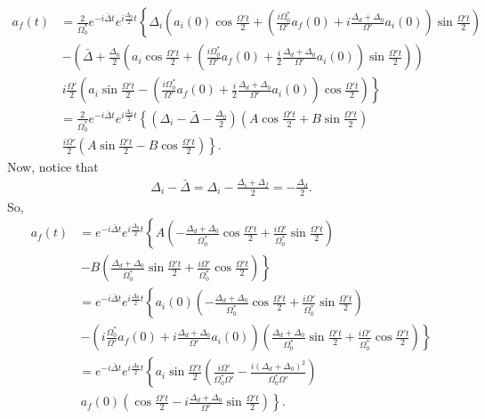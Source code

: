 \documentclass{article}
\begin{document}
\begin{align}
a_f(t) &= \frac{2}{\Omega^*_0}e^{-i\bar{\Delta}t}e^{i\frac{\Delta_0}{2}t}\left\{\Delta_i\left( a_i(0)\cos\frac{\Omega't}{2} + \left(\frac{i\Omega^*_0}{\Omega'}a_f(0) + i\frac{\Delta_d + \Delta_0}{\Omega'}a_i(0) \right)\sin\frac{\Omega't}{2} \right)  \right.\nonumber\\ 
&{\,}\left. -\left(\bar{\Delta} + \frac{\Delta_0}{2}\left(a_i\cos\frac{\Omega't}{2} + \left( \frac{i\Omega^*_0}{\Omega'}a_f(0)+\frac{i}{2}\frac{\Delta_d + \Delta_0}{\Omega'}a_i(0) \right)\sin\frac{\Omega't}{2}  \right)  \right)\right.\nonumber\\
&{\,}\left. i\frac{\Omega'}{2}\left(a_i\sin\frac{\Omega't}{2}-\left( \frac{i\Omega^*_0}{\Omega'}a_f(0)+\frac{i}{2}\frac{\Delta_d + \Delta_0}{\Omega'}a_i(0) \right)\cos\frac{\Omega't}{2}   \right)\right\}\nonumber\\
&= \frac{2}{\Omega^*_0}e^{-i\bar{\Delta}t}e^{i\frac{\Delta_0}{2}t}\left\{ \left(\Delta_i-\bar{\Delta}-\frac{\Delta_0}{2} \right)\left(A\cos\frac{\Omega't}{2} + B\sin\frac{\Omega't}{2} \right) \right.\nonumber\\
&{\,}\left.\frac{i\Omega'}{2}\left(A\sin\frac{\Omega't}{2} - B\cos\frac{\Omega't}{2} \right)\right\}.
\end{align}
Now, notice that
\begin{align}
\Delta_i  - \bar{\Delta} = \Delta_i - \frac{\Delta_i + \Delta_f}{2} = -\frac{\Delta_d}{2}.
\end{align}
So,
\begin{align}
a_f(t) &= e^{-i\bar{\Delta}t}e^{i\frac{\Delta_0}{2}t}\left\{A\left(-\frac{\Delta_d + \Delta_0}{\Omega^*_0}\cos\frac{\Omega't}{2} + \frac{i\Omega'}{\Omega^*_0}\sin\frac{\Omega't}{2} \right)\right.\nonumber\\ 
&{\,} \left. -B\left(\frac{\Delta_d + \Delta_0}{\Omega^*_0}\sin\frac{\Omega't}{2} +  \frac{i\Omega'}{\Omega^*_0}\cos\frac{\Omega't}{2}\right)  \right\}\nonumber\\
&= e^{-i\bar{\Delta}t}e^{i\frac{\Delta_0}{2}t}\left\{a_i(0)\left(-\frac{\Delta_d + \Delta_0}{\Omega^*_0}\cos\frac{\Omega't}{2} + \frac{i\Omega'}{\Omega^*_0}\sin\frac{\Omega't}{2} \right)\right.\nonumber\\ 
&{\,} \left. -\left(i\frac{\Omega^*_0}{\Omega'}a_f(0) + i\frac{\Delta_d + \Delta_0}{\Omega'}a_i(0) \right) \left(\frac{\Delta_d + \Delta_0}{\Omega^*_0}\sin\frac{\Omega't}{2} +  \frac{i\Omega'}{\Omega^*_0}\cos\frac{\Omega't}{2}\right)  \right\}\nonumber\\
&= e^{-i\bar{\Delta}t}e^{i\frac{\Delta_0}{2}t}\left\{a_i\sin\frac{\Omega't}{2}\left( \frac{i\Omega'}{\Omega^*_0\Omega'} - \frac{i(\Delta_d + \Delta_0)^2}{\Omega^*_0\Omega'}\right)\right.\nonumber\\ 
&{\,} \left.a_f(0)\left(\cos\frac{\Omega't}{2}-i\frac{\Delta_d + \Delta_0}{\Omega'}\sin\frac{\Omega't}{2} \right) \right\}.
\end{align}
\end{document}
